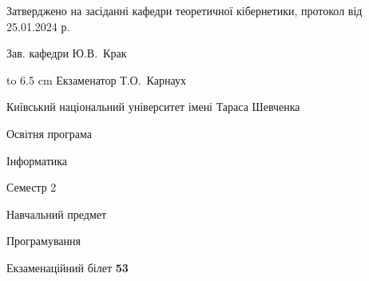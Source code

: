 \documentclass[12pt, ukrainian]{article}
\begin{document}
{\smallskip\smallskip \begin {scriptsize} Затверджено на засіданні кафедри теоретичної кібернетики, протокол   від   25.01.2024 р.\par\smallskip\smallskip\smallskip\smallskip
{\parbox {6.5 cm} {Зав. кафедри \dotfill Ю.В.~Крак}}\hspace {0.7cm} {\hbox to 6.5 cm { Екзаменатор \dotfill Т.О.~Карнаух}} \end{scriptsize}}
\newpage
{{\begin {scriptsize}\par
{ \center  Київський національний університет імені Тараса Шевченка \par}
{\parbox {5 cm}{Освітня програма \hfill}{\parbox {7 cm}{Інформатика\hfill}}\parbox {6 cm}{\hfill Семестр 2}}\par
{\parbox {5 cm} {Навчальний предмет \hfill}\parbox {7 cm}{Програмування \hfill}\parbox {6cm}{\hfill}\par}\vspace{-15pt} \end{scriptsize}}{\center Екзаменаційний білет \No \textbf { 53 }\par}}
\end{document}
